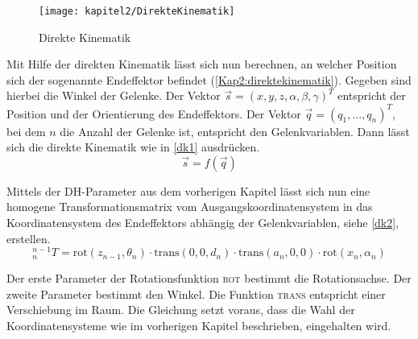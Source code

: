 \begin{figure}[b!]
  \centering
  \texttt{[image: kapitel2/DirekteKinematik]}
  \caption{Direkte Kinematik}
  \label{Kap2:direktekinematik}
\end{figure}

Mit Hilfe der direkten Kinematik lässt sich nun berechnen, an welcher Position sich der sogenannte Endeffektor befindet (\autoref{Kap2:direktekinematik}). Gegeben sind hierbei die Winkel der Gelenke. Der Vektor $ \vec{s} = (x,y,z,\alpha,\beta,\gamma)^T $  entspricht der Position und der Orientierung des Endeffektors. Der Vektor $ \vec{q} = (q_1, ...,q_n)^T $, bei dem $n$ die Anzahl der Gelenke ist, entspricht den Gelenkvariablen. Dann lässt sich die direkte Kinematik wie in \autoref{dk1} ausdrücken.
\begin{equation}
  \vec{s} = f(\vec{q})
\label{dk1}
\end{equation}

Mittels der DH-Parameter aus dem vorherigen Kapitel lässt sich nun eine homogene Transformationsmatrix vom Ausgangskoordinatensystem in das Koordinatensystem des Endeffektors abhängig der Gelenkvariablen, siehe \autoref{dk2}, erstellen.
\begin{equation}
  ^{n-1}_{n}T = \textrm{rot}(z_{n-1},\theta_n) \cdot \textrm{trans}(0,0,d_{n}) \cdot \textrm{trans}(a_{n},0,0) \cdot \textrm{rot}(x_{n},\alpha_{n})
\label{dk2}
\end{equation}

Der erste Parameter der Rotationsfunktion \textsc{rot} bestimmt die Rotationsachse. Der zweite Parameter bestimmt den Winkel. Die Funktion \textsc{trans} entspricht einer Verschiebung im Raum. Die Gleichung setzt voraus, dass die Wahl der Koordinatensysteme wie im vorherigen Kapitel beschrieben, eingehalten wird.

